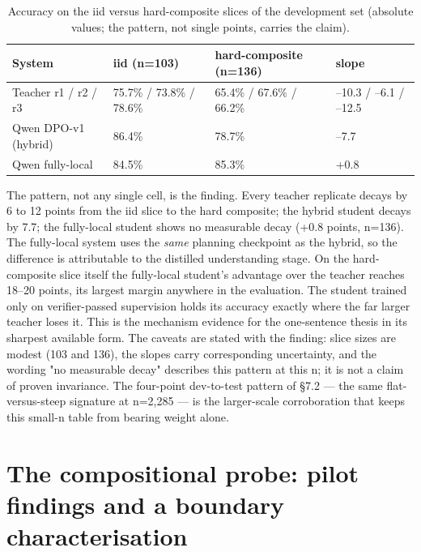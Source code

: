 \documentclass[10pt]{article} %
\begin{document}
\begin{table}[t]
\centering
\small
\caption{Accuracy on the iid versus hard-composite slices of the development set (absolute values; the pattern, not single points, carries the claim).}
\label{tab:07_analysis_1}
\begin{tabular}{llll}
\toprule
System & iid (n=103) & hard-composite (n=136) & slope \\
\midrule
Teacher r1 / r2 / r3 & 75.7\% / 73.8\% / 78.6\% & 65.4\% / 67.6\% / 66.2\% & --10.3 / --6.1 / --12.5 \\
Qwen DPO-v1 (hybrid) & 86.4\% & 78.7\% & --7.7 \\
Qwen fully-local & 84.5\% & 85.3\% & +0.8 \\
\bottomrule
\end{tabular}
\end{table}


The pattern, not any single cell, is the finding. Every teacher replicate decays by 6 to 12 points from the iid slice to the hard composite; the hybrid student decays by 7.7; the fully-local student shows no measurable decay (+0.8 points, n=136). The fully-local system uses the \emph{same} planning checkpoint as the hybrid, so the difference is attributable to the distilled understanding stage. On the hard-composite slice itself the fully-local student's advantage over the teacher reaches 18--20 points, its largest margin anywhere in the evaluation. The student trained only on verifier-passed supervision holds its accuracy exactly where the far larger teacher loses it. This is the mechanism evidence for the one-sentence thesis in its sharpest available form. The caveats are stated with the finding: slice sizes are modest (103 and 136), the slopes carry corresponding uncertainty, and the wording "no measurable decay" describes this pattern at this n; it is not a claim of proven invariance. The four-point dev-to-test pattern of \S7.2 --- the same flat-versus-steep signature at n=2,285 --- is the larger-scale corroboration that keeps this small-n table from bearing weight alone.

\section{The compositional probe: pilot findings and a boundary characterisation}\label{sec:the-compositional-probe-pilot-findings-a}
\end{document}
